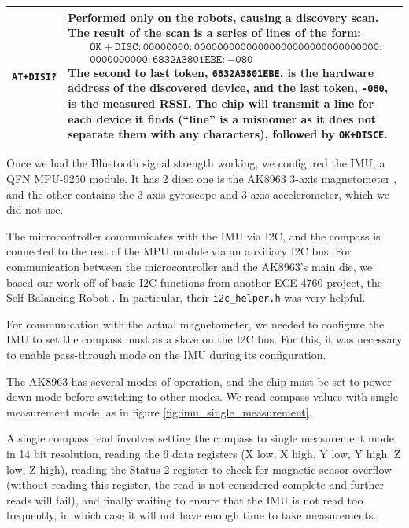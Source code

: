 \documentclass[]{article}
\begin{document}
\begin{table}[]
\begin{tabularx}{\textwidth}{@{}l X@{}}
\texttt{AT+DISI?} & Performed only on the robots, causing a discovery
scan. The result of the scan is a series of lines of the form:
{\begin{align*}
&\mathtt{OK+DISC:00000000:00000000000000000000000000000000:}\\
&\mathtt{  0000000000:6832A3801EBE:-080}
\end{align*}}
The second to last token, \texttt{6832A3801EBE}, is the hardware
address of the discovered device, and the last token, \texttt{-080},
is the measured RSSI. The chip will transmit a line for each device it
finds (``line'' is a misnomer as it does not separate them with any
characters), followed by \texttt{OK+DISCE}. \\
\bottomrule
\end{tabularx}
\end{table}

Once we had the Bluetooth signal strength working, we configured the IMU,
a QFN MPU-9250 \cite{mpu9250datasheet} \cite{mpu9250regmap} module.
It has 2 dies: one is the AK8963 3-axis magnetometer \cite{ak8963cdatasheet},
and the other contains the 3-axis gyroscope and 3-axis accelerometer, which we did not use.

The microcontroller communicates with the IMU via I2C, and the compass is connected to the rest of the MPU module via an auxiliary I2C bus. For communication between the microcontroller and the AK8963's main die, we based our work off of basic I2C functions from another ECE 4760 project, the Self-Balancing Robot \cite{selfbalancingrobot}. In particular, their \texttt{i2c\_helper.h} was very helpful.

For communication with the actual magnetometer, we needed to configure the IMU to set the compass must as a slave on the I2C bus. For this, it was necessary to enable pass-through mode on the IMU during its configuration.

The AK8963 has several modes of operation, and the chip must be set to power-down mode before switching to other modes.
We read compass values with single measurement mode, as in figure \ref{fig:imu_single_measurement}.

A single compass read involves setting the compass to single measurement mode in 14 bit resolution, reading the 6 data registers (X low, X high, Y low, Y high, Z low, Z high), reading the Status 2 register to check for magnetic sensor overflow (without reading this register, the read is not considered complete and further reads will fail), and finally waiting to ensure that the IMU is not read too frequently, in which case it will not have enough time to take measurements.
\end{document}

